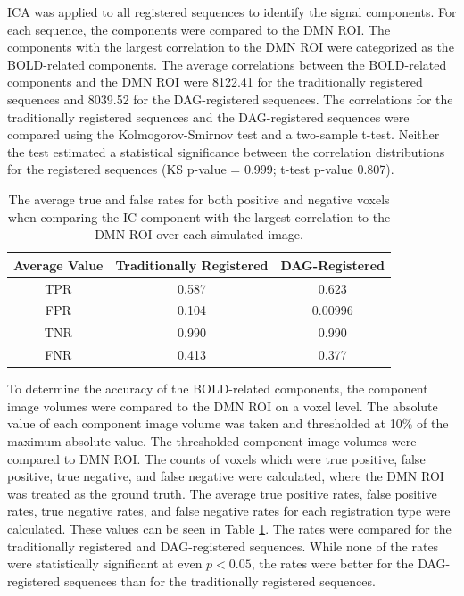 ICA was applied to all registered sequences to identify the signal components. For each sequence, the components were compared to the DMN ROI. The components with the largest correlation to the DMN ROI were categorized as the BOLD-related components. The average correlations between the BOLD-related components and the DMN ROI were 8122.41 for the traditionally registered sequences and 8039.52 for the DAG-registered sequences. The correlations for the traditionally registered sequences and the DAG-registered sequences were compared using the Kolmogorov-Smirnov test and a two-sample t-test. Neither the test estimated a statistical significance between the correlation distributions for the registered sequences (KS p-value = 0.999; t-test p-value 0.807).

\begin{table}[]
\centering
\caption{The average true and false rates for both positive and negative voxels when comparing the IC component with the largest correlation to the DMN ROI over each simulated image.}
\label{tab:spectr-avg-rates}
\begin{tabular}{|c|c|c|}
\hline
\textbf{Average Value} & \textbf{Traditionally Registered} & \textbf{DAG-Registered} \\ \hline
TPR                    & 0.587                             & 0.623                   \\ \hline
FPR                    & 0.104                             & 0.00996                 \\ \hline
TNR                    & 0.990                             & 0.990                   \\ \hline
FNR                    & 0.413                             & 0.377                   \\ \hline
\end{tabular}
\end{table}

To determine the accuracy of the BOLD-related components, the component image volumes were compared to the DMN ROI on a voxel level. The absolute value of each component image volume was taken and thresholded at 10\% of the maximum absolute value. The thresholded component image volumes were compared to DMN ROI. The counts of voxels which were true positive, false positive, true negative, and false negative were calculated, where the DMN ROI was treated as the ground truth. The average true positive rates, false positive rates, true negative rates, and false negative rates for each registration type were calculated. These values can be seen in Table \ref{tab:spectr-avg-rates}. The rates were compared for the traditionally registered and DAG-registered sequences. While none of the rates were statistically significant at even $ p < 0.05$, the rates were better for the DAG-registered sequences than for the traditionally registered sequences. 

